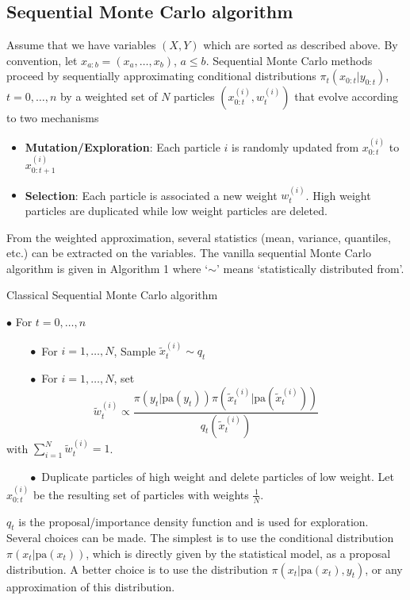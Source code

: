 \documentclass[article,shortnames]{jss}
\begin{document}
\subsection{Sequential Monte Carlo algorithm}
Assume that we have variables $(X,Y)$ which are sorted as described above. By convention, let $x_{a:b}=(x_a,\ldots,x_b)$, $a\leq b$. Sequential Monte Carlo methods~\citep{Doucet2001,DelMoral2004,Doucet2010} proceed by sequentially approximating conditional distributions $\pi_t(x_{0:t}|y_{0:t})$, $t=0,\ldots,n$ by a weighted set of $N$ particles $(x_{0:t}^{(i)},w_t^{(i)})$ that evolve according to two mechanisms
\begin{itemize}
\item \textbf{Mutation/Exploration}: Each particle $i$ is randomly updated from $x_{0:t}^{(i)}$ to $x_{0:t+1}^{(i)}$
\item \textbf{Selection}: Each particle is associated a new weight $w_t^{(i)}$. High weight particles are duplicated while low weight particles are deleted.
\end{itemize}

From the weighted approximation, several statistics (mean, variance, quantiles, etc.) can be extracted on the variables. The vanilla sequential Monte Carlo algorithm is given in Algorithm 1 where `$\sim$' means `statistically distributed from'.

\begin{algorithm}
\caption{Classical Sequential Monte Carlo algorithm}
\label{algo}
$\bullet$ For $t=0,\ldots,n$

$\qquad \bullet$ For $i=1,\ldots,N$, Sample $\widetilde{x}_t^{(i)}\sim q_t$


$\qquad \bullet$ For $i=1,\ldots,N$, set
$$
\widetilde{w}_t^{(i)}\propto\frac{\pi(y_t|\text{pa}(y_t))\pi(\widetilde{x}_t^{(i)}|\text{pa}(\widetilde{x}_t^{(i)}))}{q_t(\widetilde{x}_t^{(i)})}
$$
with $\sum_{i=1}^N \widetilde{w}_t^{(i)}=1$.

$\qquad \bullet$ Duplicate particles of high weight and delete particles of low weight. Let $x_{0:t}^{(i)}$ be the resulting set of particles with weights $\frac{1}{N}$.
\end{algorithm}

$q_t$ is the proposal/importance density function and is used for exploration. Several choices can be made. The simplest is to use the conditional distribution $\pi(x_t|\text{pa}(x_t))$, which is directly given by the statistical model, as a proposal distribution. A better choice is to use the distribution $\pi(x_t|\text{pa}(x_t), y_t)$, or any approximation of this distribution.
\end{document}
